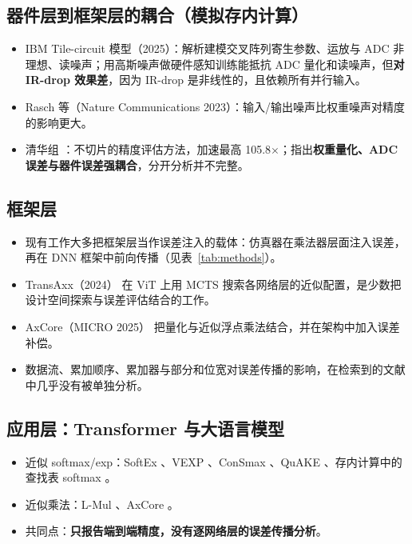 \documentclass[11pt,a4paper]{ctexart}
\begin{document}
\subsection{器件层到框架层的耦合（模拟存内计算）}
\begin{itemize}[leftmargin=*]
  \item IBM Tile-circuit 模型（2025）\cite{ibmtile}：解析建模交叉阵列寄生参数、运放与 ADC 非理想、读噪声；用高斯噪声做硬件感知训练能抵抗 ADC 量化和读噪声，但\textbf{对 IR-drop 效果差}，因为 IR-drop 是非线性的，且依赖所有并行输入。
  \item Rasch 等（Nature Communications 2023）\cite{rasch2023}：输入/输出噪声比权重噪声对精度的影响更大。
  \item 清华组 \cite{thuaccuracy}：不切片的精度评估方法，加速最高 105.8$\times$；指出\textbf{权重量化、ADC 误差与器件误差强耦合}，分开分析并不完整。
\end{itemize}

\subsection{框架层}
\begin{itemize}[leftmargin=*]
  \item 现有工作大多把框架层当作误差注入的载体：仿真器在乘法器层面注入误差，再在 DNN 框架中前向传播（见表~\ref{tab:methods}）。
  \item TransAxx（2024）\cite{transaxx} 在 ViT 上用 MCTS 搜索各网络层的近似配置，是少数把设计空间探索与误差评估结合的工作。
  \item AxCore（MICRO 2025）\cite{axcore} 把量化与近似浮点乘法结合，并在架构中加入误差补偿。
  \item 数据流、累加顺序、累加器与部分和位宽对误差传播的影响，在检索到的文献中几乎没有被单独分析。
\end{itemize}

\subsection{应用层：Transformer 与大语言模型}
\begin{itemize}[leftmargin=*]
  \item 近似 softmax/exp：SoftEx \cite{softex}、VEXP \cite{vexp}、ConSmax \cite{consmax}、QuAKE \cite{quake}、存内计算中的查找表 softmax \cite{cimsoftmax}。
  \item 近似乘法：L-Mul \cite{lmul}、AxCore \cite{axcore}。
  \item 共同点：\textbf{只报告端到端精度，没有逐网络层的误差传播分析}。
\end{itemize}
\end{document}
